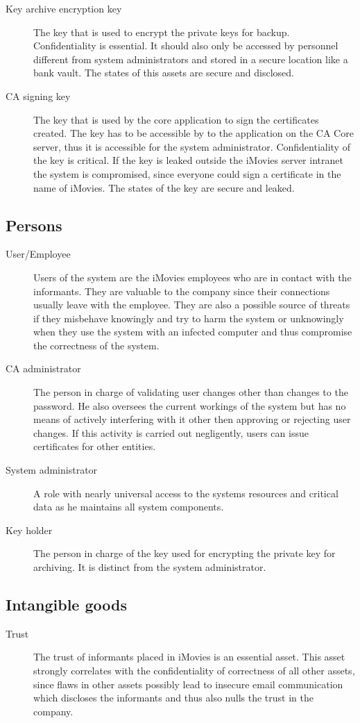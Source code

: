 \documentclass[a4paper, toc=index, 12pt, DIV14, twoside, BCOR2cm, headsepline, numbers=noenddot, bibliography=totoc]{scrbook}
\begin{document}
\begin{description}
\item[Key archive encryption key] The key that is used to encrypt the private keys for backup. Confidentiality is essential. It should also only be accessed by personnel different from system administrators and stored in a secure location like a bank vault. The states of this assets are secure and disclosed.
\item[CA signing key] The key that is used by the core application to sign the certificates created. The key has to be accessible by to the application on the CA Core server, thus it is accessible for the system administrator. Confidentiality of the key is critical. If the key is leaked outside the iMovies server intranet the system is compromised, since everyone could sign a certificate in the name of iMovies. The states of the key are secure and leaked.
\end{description}
\subsection{Persons}
\begin{description}
\item[User/Employee ] Users of the system are the iMovies employees who are in contact with the informants. They are valuable to the company since their connections usually leave with the employee. They are also a possible source of threats if they misbehave knowingly and try to harm the system or unknowingly when they use the system with an infected computer and thus compromise the correctness of the system.
\item[CA administrator ] The person in charge of validating user changes other than changes to the password. He also oversees the current workings of the system but has no means of actively interfering with it other then approving or rejecting user changes. If this activity is carried out negligently, users can issue certificates for other entities.
\item[System administrator ] A role with nearly universal access to the systems resources and critical data as he maintains all system components.
\item[Key holder ] The person in charge of the key used for encrypting the private key for archiving. It is distinct from the system administrator.
\end{description}

\subsection{Intangible goods}
\begin{description}
\item[Trust ] The trust of informants placed in iMovies is an essential asset. This asset strongly correlates with the confidentiality of correctness of all other assets, since flaws in other assets possibly lead to insecure email communication which discloses the informants and thus also nulls the trust in the company.
\end{description}
\end{document}
